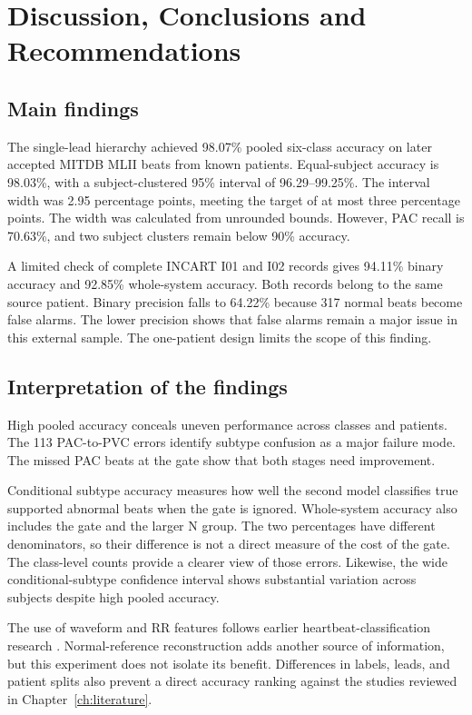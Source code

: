 \chapter[head=Discussion and conclusions]{Discussion, Conclusions and Recommendations}\label{ch:conclusion}

\section{Main findings}
The single-lead hierarchy achieved 98.07\% pooled six-class accuracy
on later accepted MITDB MLII beats from known patients. Equal-subject
accuracy is 98.03\%, with a subject-clustered 95\% interval of
96.29--99.25\%. The interval width was 2.95 percentage points, meeting the target of at most
three percentage points. The width was calculated from unrounded bounds. However, PAC recall is 70.63\%, and two subject clusters
remain below 90\% accuracy.

A limited check of complete INCART I01 and I02 records gives 94.11\%
binary accuracy and 92.85\% whole-system accuracy. Both records belong to
the same source patient. Binary precision falls to 64.22\% because 317
normal beats become false alarms. The lower precision shows that false alarms remain a major issue in this
external sample. The one-patient design limits the scope of this finding.

\section{Interpretation of the findings}
High pooled accuracy conceals uneven performance across classes and patients.
The 113 PAC-to-PVC errors identify subtype confusion as a major failure mode.
The missed PAC beats at the gate show that both stages need improvement.

Conditional subtype accuracy measures how well the second model classifies
true supported abnormal beats when the gate is ignored. Whole-system accuracy
also includes the gate and the larger N group. The two percentages have
different denominators, so their difference is not a direct measure of the
cost of the gate. The class-level counts provide a clearer view of those
errors. Likewise, the wide conditional-subtype confidence interval shows
substantial variation across subjects despite high pooled accuracy.

The use of waveform and RR features follows earlier heartbeat-classification
research \cite{dechazal2004heartbeat}. Normal-reference reconstruction adds
another source of information, but this experiment does not isolate its
benefit. Differences in labels, leads, and patient splits also prevent a
direct accuracy ranking against the studies reviewed in
Chapter~\ref{ch:literature}.


